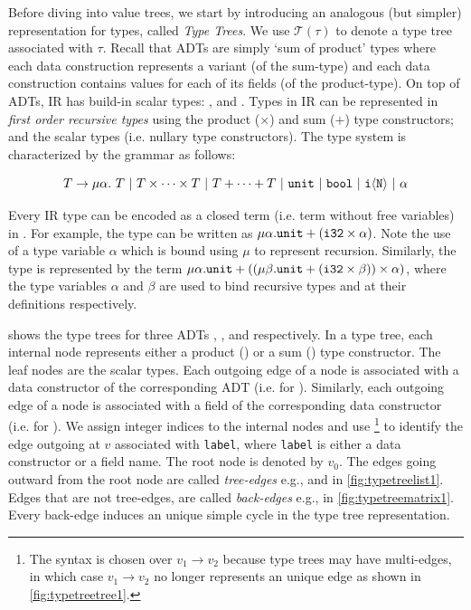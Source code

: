 Before diving into value trees, we start by introducing an analogous (but simpler) representation for types, called {\em Type Trees}.
We use $\mathcal{T}(\tau)$ to denote a type tree associated with $\tau$.
Recall that ADTs are simply `sum of product' types where each data construction represents a variant (of the sum-type) and
each data construction contains values for each of its fields (of the product-type).
On top of ADTs, IR has build-in scalar types: ,  and .
Types in IR can be represented in {\em first order recursive types} \cite{recursivetypestrees} using the product ($\times$) and sum ($+$) type
constructors; and the scalar types (i.e. nullary type constructors).
The type system is characterized by the grammar \typegrammar{} as follows:

$$
T \rightarrow \mu \alpha. \ T \ |\ T \times \dots \times T \ |\  T + \dots + T \ |\  \type{unit} \ |\ \type{bool} \ |\  \type{i\langle N \rangle} \ |\ \alpha
$$

Every IR type can be encoded as a closed term (i.e. term without free variables) in \typegrammar{}.
For example, the  type can be written as $\mu \alpha. {\tt unit} + ({\tt i32} \times \alpha)$.
Note the use of a type variable $\alpha$ which is bound using $\mu$ to represent recursion.
Similarly, the  type is represented by the term
$\mu \alpha. {\tt unit} + ((\mu \beta. {\tt unit} + ({\tt i32} \times \beta)) \times \alpha)$,
where the type variables $\alpha$ and $\beta$ are used to bind recursive types  and 
at their definitions respectively.



 shows the type trees for three ADTs , , and  respectively.
In a type tree, each internal node represents either a product (\prodn{}) or a sum (\sumn{}) type constructor.
The leaf nodes are the scalar types.
Each outgoing edge of a \sumn{} node is associated with a data constructor of the corresponding ADT (i.e.  for ).
Similarly, each outgoing edge of a \prodn{} node is associated with a field of the corresponding data constructor (i.e.  for ).
We assign integer indices to the internal nodes and use \footnote{
The  syntax is chosen over $v_1 \rightarrow v_2$ because type trees may have multi-edges, in which case
$v_1 \rightarrow v_2$ no longer represents an unique edge as shown in \cref{fig:typetreetree1}.} to identify the edge outgoing at $v$ associated with {\tt label},
where {\tt label} is either a data constructor or a field name.
The root node is denoted by $v_0$.
The edges going outward from the root node are called {\em tree-edges} e.g.,  and  in \cref{fig:typetreelist1}.
Edges that are not tree-edges, are called {\em back-edges} e.g.,  in \cref{fig:typetreematrix1}.
Every back-edge induces an unique simple cycle in the type tree representation.

